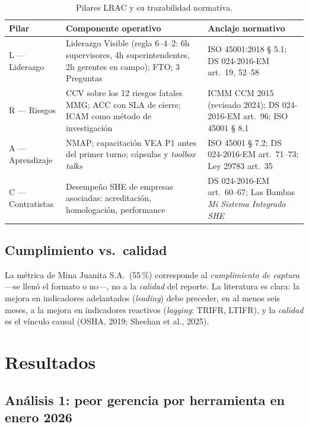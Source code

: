 \documentclass[12pt,a4paper]{article}
\begin{document}
\begin{table}[h]
\centering
\small
\begin{tabularx}{\linewidth}{l X X}
\toprule
\textbf{Pilar} & \textbf{Componente operativo} & \textbf{Anclaje normativo} \\
\midrule
L --- Liderazgo & Liderazgo Visible (regla 6--4--2: 6h supervisores, 4h superintendentes, 2h gerentes en campo); FTO; 3 Preguntas & ISO 45001:2018 § 5.1; DS 024-2016-EM art.~19, 52--58 \\
R --- Riesgos & CCV sobre los 12 riesgos fatales MMG; ACC con SLA de cierre; ICAM como método de investigación & ICMM CCM 2015 (revisado 2024); DS 024-2016-EM art.~96; ISO 45001 § 8.1 \\
A --- Aprendizaje & NMAP; capacitación VEA P1 antes del primer turno; cápsulas y \emph{toolbox talks} & ISO 45001 § 7.2; DS 024-2016-EM art.~71--73; Ley 29783 art.~35 \\
C --- Contratistas & Desempeño SHE de empresas asociadas: acreditación, homologación, performance & DS 024-2016-EM art.~60--67; Las Bambas \emph{Mi Sistema Integrado SHE} \\
\bottomrule
\end{tabularx}
\caption{Pilares LRAC y su trazabilidad normativa.}
\label{tab:pilares}
\end{table}

\subsection{Cumplimiento vs.\ calidad}
La métrica de Mina Juanita S.A.\ (55\,\%) corresponde al \emph{cumplimiento de captura} ---se llenó el formato o no---, no a la \emph{calidad} del reporte. La literatura es clara: la mejora en indicadores adelantados (\emph{leading}) debe preceder, en al menos seis meses, a la mejora en indicadores reactivos (\emph{lagging}: TRIFR, LTIFR), y la \emph{calidad} es el vínculo causal (OSHA, 2019; Sheehan et al., 2025).

\section{Resultados}

\subsection{Análisis 1: peor gerencia por herramienta en enero 2026}
\end{document}
